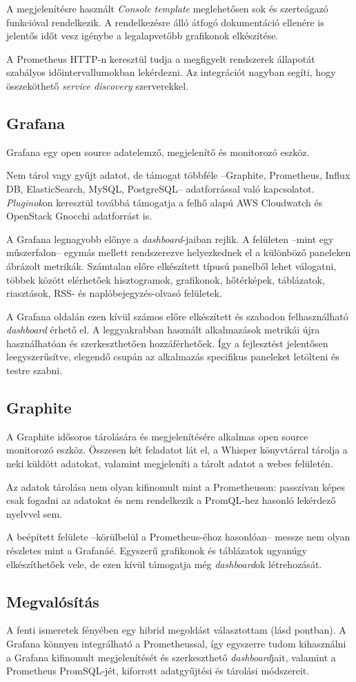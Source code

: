 A megjelenítésre használt \textit{Console template} meglehetősen sok és szerteágazó funkcióval rendelkezik. A rendelkezésre álló átfogó dokumentáció ellenére is jelentős időt vesz igénybe a legalapvetőbb grafikonok elkészítése.

A Prometheus HTTP-n keresztül tudja a megfigyelt rendszerek állapotát szabályos időintervallumokban lekérdezni. Az integrációt nagyban segíti, hogy összeköthető \textit{service discovery} szerverekkel.

\subsection{Grafana}
Grafana egy open source adatelemző, megjelenítő és monitorozó eszköz.

Nem tárol vagy gyűjt adatot, de támogat többféle --Graphite, Prometheus, Influx DB, ElasticSearch, MySQL, PostgreSQL-- adatforrással való kapcsolatot. \textit{Pluginok}on keresztül továbbá támogatja a felhő alapú AWS Cloudwatch és OpenStack Gnocchi adatforrást is.


A Grafana legnagyobb előnye a \textit{dashboard}-jaiban rejlik. A felületen --mint egy műszerfalon-- egymás mellett rendszerezve helyezkednek el a különböző paneleken ábrázolt metrikák. Számtalan előre elkészített típusú panelből lehet válogatni, többek között elérhetőek hisztogramok, grafikonok, hőtérképek, táblázatok, riasztások, RSS- és naplóbejegyzés-olvasó felületek.

A Grafana oldalán ezen kívül számos előre elkészített és szabadon felhasználható \textit{dashboard} érhető el. A leggyakrabban használt alkalmazások metrikái újra használhatóan és szerkeszthetően hozzáférhetőek. Így a fejlesztést jelentősen leegyszerűsítve, elegendő csupán az alkalmazás specifikus paneleket letölteni és testre szabni.

\subsection{Graphite}
A Graphite idősoros tárolására és megjelenítésére alkalmas open source monitorozó eszköz. Összesen két feladatot lát el, a Whisper könyvtárral tárolja a neki küldött adatokat, valamint megjeleníti a tárolt adatot a webes felületén.

Az adatok tárolása nem olyan kifinomult mint a Prometheuson: passzívan képes csak fogadni az adatokat és nem rendelkezik a PromQL-hez hasonló lekérdező nyelvvel sem.

A beépített felülete --körülbelül a Prometheus-éhoz hasonlóan-- messze nem olyan részletes mint a Grafanáé. Egyszerű grafikonok és táblázatok ugyanúgy elkészíthetőek vele, de ezen kívül támogatja még \textit{dashboard}ok létrehozását.


\subsection{Megvalósítás}
A fenti ismeretek fényében egy hibrid megoldást választottam (lásd  pontban). A Grafana könnyen integrálható a Prometheussal, így egyszerre tudom kihasználni a Grafana kifinomult megjelenítését és szerkeszthető \textit{dashboard}jait, valamint a Prometheus PromSQL-jét, kiforrott adatgyűjtési és tárolási módszereit.